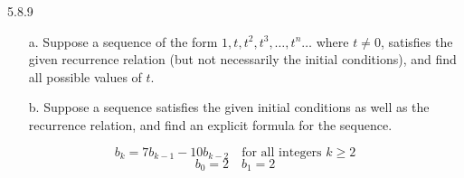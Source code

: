 \begin{question}
    {5.8.9}
    {
        \begin{enumerate}
            \item[a.] Suppose a sequence of the form $1,t,t^2,t^3, \ldots, t^n \ldots$ where $t \neq 0$, satisfies the given recurrence relation (but not necessarily the initial conditions), and find all possible values of $t$.
            \item[b.] Suppose a sequence satisfies the given initial conditions as well as the recurrence relation, and find an explicit formula for the sequence.
        \end{enumerate}
        \begin{equation*}
            b_k = 7b_{k-1} - 10b_{k-2} \quad \text{for all integers $k \geq 2$}
        \end{equation*}
        \begin{equation*}
            b_0 = 2 \quad b_1=2
        \end{equation*}
        \vspace{-\baselineskip}
    }
\end{question}
